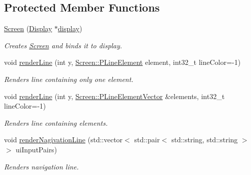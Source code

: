 \subsection*{Protected Member Functions}
\begin{DoxyCompactItemize}
\item 
\mbox{\hyperlink{classScreen_a596e7fffdfafd57fb5385c299863f31d}{Screen}} (\mbox{\hyperlink{classDisplay}{Display}} $\ast$\mbox{\hyperlink{classScreen_aad713267725e8aa8a8def951a07de641}{display}})
\begin{DoxyCompactList}\small\item\em Creates \mbox{\hyperlink{classScreen}{Screen}} and binds it to display. \end{DoxyCompactList}\item 
void \mbox{\hyperlink{classScreen_a30226bc0c228db9f74f337af86cf34ed}{render\+Line}} (int y, \mbox{\hyperlink{classScreen_a3696376a0036dc304d337dc5e697d6f9}{Screen\+::\+P\+Line\+Element}} element, int32\+\_\+t line\+Color=-\/1)
\begin{DoxyCompactList}\small\item\em Renders line containing only one element. \end{DoxyCompactList}\item 
void \mbox{\hyperlink{classScreen_a21262307ae7898dfa1b27bb0c60247b7}{render\+Line}} (int y, \mbox{\hyperlink{classScreen_a62e857d5d7fcfd58fe241c1e933ac3bb}{Screen\+::\+P\+Line\+Element\+Vector}} \&elements, int32\+\_\+t line\+Color=-\/1)
\begin{DoxyCompactList}\small\item\em Renders line containing elements. \end{DoxyCompactList}\item 
void \mbox{\hyperlink{classScreen_a435b179ec61ea7ad8126102a00051b88}{render\+Nagivation\+Line}} (std\+::vector$<$ std\+::pair$<$ std\+::string, std\+::string $>$$>$ ui\+Input\+Pairs)
\begin{DoxyCompactList}\small\item\em Renders navigation line. \end{DoxyCompactList}\end{DoxyCompactItemize}
